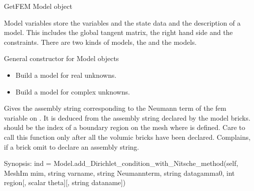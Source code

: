 \documentclass[a4paper,11pt,english]{sphinxmanual}
\begin{document}
\begin{fulllineitems}
\label{\detokenize{python/cmdref_Model:getfem.Model}}
GetFEM Model object

Model variables store the variables and the state data and the
description of a model. This includes the global tangent matrix, the right
hand side and the constraints. There are two kinds of models, the 
and the  models.

General constructor for Model objects
\begin{itemize}
\item {} 
Build a model for real unknowns.

\item {} 
Build a model for complex unknowns.

\end{itemize}

\begin{fulllineitems}
\label{\detokenize{python/cmdref_Model:getfem.Model.Neumann_term}}
Gives the assembly string corresponding to the Neumann term of
the fem variable  on . It is deduced from the
assembly string declared by the model bricks.
 should be the index of a boundary region
on the mesh where  is defined. Care to call this function
only after all the volumic bricks have been declared.
Complains, if a brick
omit to declare an assembly string.

\end{fulllineitems}


\begin{fulllineitems}
\label{\detokenize{python/cmdref_Model:getfem.Model.add_Dirichlet_condition_with_Nitsche_method}}
Synopsis: ind = Model.add\_Dirichlet\_condition\_with\_Nitsche\_method(self, MeshIm mim, string varname, string Neumannterm, string datagamma0, int region{[}, scalar theta{]}{[}, string dataname{]})


\end{fulllineitems}
\end{fulllineitems}
\end{document}
